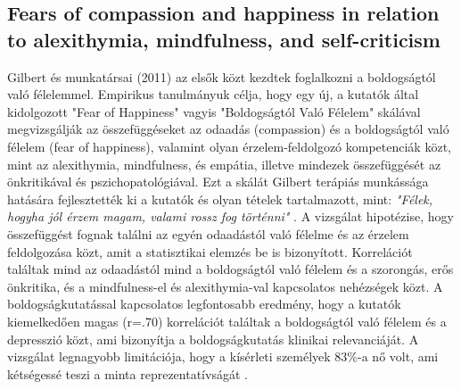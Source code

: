 \subsection*{Fears of compassion and happiness in relation	to alexithymia, mindfulness, and self-criticism \cite{gilbert_mcewan_gibbons_chotai_duarte_matos_2011}}
Gilbert és munkatársai (2011) az elsők közt kezdtek foglalkozni a boldogságtól való félelemmel. Empirikus tanulmányuk célja, hogy egy új, a kutatók által kidolgozott "Fear of Happiness" vagyis "Boldogságtól Való Félelem" skálával \cite{gilbert_mcewan_gibbons_chotai_duarte_matos_2011} megvizsgálják az összefüggéseket az odaadás (compassion) és a boldogságtól való félelem (fear of happiness), valamint olyan érzelem-feldolgozó kompetenciák közt, mint az  alexithymia, mindfulness, és empátia, illetve mindezek összefüggését az önkritikával és pszichopatológiával. Ezt a skálát Gilbert terápiás munkássága hatására fejlesztették ki a kutatók és olyan tételek tartalmazott, mint: \textit{"Félek, hogyha jól érzem magam, valami rossz fog történni"} \cite[o. 381]{gilbert_mcewan_gibbons_chotai_duarte_matos_2011}. A vizsgálat hipotézise, hogy összefüggést fognak találni az egyén odaadástól való félelme és az érzelem feldolgozása közt, amit a statisztikai elemzés be is bizonyított. Korrelációt találtak mind az odaadástól mind a boldogságtól való félelem és a szorongás, erős önkritika, és a mindfulness-el és alexithymia-val kapcsolatos nehézségek közt. A boldogságkutatással kapcsolatos legfontosabb eredmény, hogy a kutatók kiemelkedően magas (r=.70) korrelációt találtak a boldogságtól való félelem és a depresszió közt, ami bizonyítja a boldogságkutatás klinikai relevanciáját. A vizsgálat legnagyobb limitációja, hogy a kísérleti személyek 83\%-a nő volt, ami kétségessé teszi a minta reprezentatívságát \cite{gilbert_mcewan_gibbons_chotai_duarte_matos_2011}.

